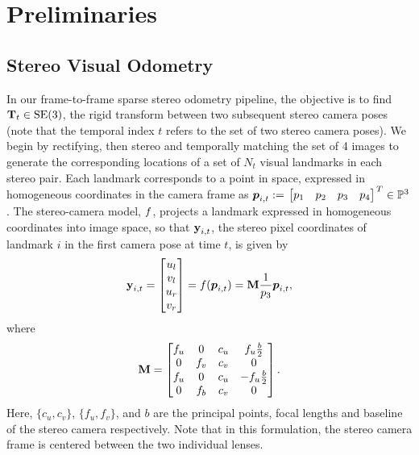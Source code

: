 \chapter{Preliminaries}
\section{Stereo Visual Odometry}

In our frame-to-frame sparse stereo odometry pipeline,  the objective is to find
$\boldsymbol{\mathbf{T}}_t\in\text{SE}(3)$, the rigid transform between two subsequent stereo camera poses (note that the temporal index $t$ refers to the set of two stereo camera poses). We begin by rectifying, then stereo and temporally
matching the set of 4 images to generate the corresponding locations of a set
of $N_t$ visual landmarks in each stereo pair.  Each landmark corresponds to a
point in space, expressed in homogeneous coordinates in the camera frame as
$\HomogeneousPoint{i}{t} := \Transpose{\bbm p_1 & p_2 & p_3 & p_4 \ebm} \in
\HomogeneousNumbers[3]$.  The stereo-camera model, $f$,
projects a landmark expressed in homogeneous coordinates into image space, so
that $\boldsymbol{\mathbf{y}}_{i,t}$, the stereo pixel coordinates of landmark $i$ in the first camera pose at time $t$, is given
by 
\begin{equation}
	\boldsymbol{\mathbf{y}}_{i,t} = \begin{bmatrix} u_l \\ v_l \\ u_r \\ v_r \end{bmatrix} 
  = f(\boldsymbol{p}_{i,t}) 
  = \boldsymbol{\mathbf{M}} \frac{1}{p_3}\boldsymbol{p}_{i,t},
\end{equation}
where
\begin{equation}
 \boldsymbol{\mathbf{M}} = \begin{bmatrix} f_u & 0 & c_u & f_u \frac{b}{2} \\ 0 & f_v & c_v & 0 \\ f_u 
                        & 0 & c_u & -f_u\frac{b}{2} \\ 0 & f_b & c_v & 0 \end{bmatrix}.
\end{equation}
Here, $\{c_u, c_v\}$, $\{f_u, f_v\}$, and $b$ are the principal points, focal
lengths and baseline of the stereo camera respectively. Note that in this
formulation, the stereo camera frame is centered between the two individual
lenses.  

